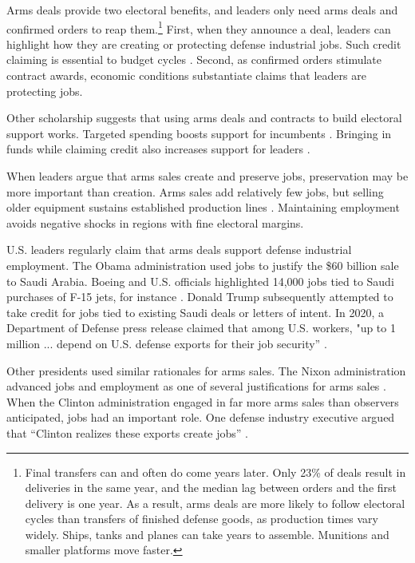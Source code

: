 \documentclass[12pt]{article}
\begin{document}
Arms deals provide two electoral benefits, and leaders only need arms deals and confirmed orders to reap them.\footnote{Final transfers can and often do come years later. 
Only 23\% of deals result in deliveries in the same year, and the median lag between orders and the first delivery is one year. 
As a result, arms deals are more likely to follow electoral cycles than transfers of finished defense goods, as production times vary widely. 
Ships, tanks and planes can take years to assemble.
Munitions and smaller platforms move faster.}
First, when they announce a deal, leaders can highlight how they are creating or protecting defense industrial jobs. 
Such credit claiming is essential to budget cycles \citep{Bueno2021}. 
Second, as confirmed orders stimulate contract awards, economic conditions substantiate claims that leaders are protecting jobs. 


Other scholarship suggests that using arms deals and contracts to build electoral support works. 
Targeted spending boosts support for incumbents \citep{KrinerReeves2012}.
Bringing in funds while claiming credit also increases support for leaders \citep{Grimmeretal2012}. 


When leaders argue that arms sales create and preserve jobs, preservation may be more important than creation. 
Arms sales add relatively few jobs, but selling older equipment sustains established production lines \citep{Caverley2018}. 
Maintaining employment avoids negative shocks in regions with fine electoral margins. 


U.S. leaders regularly claim that arms deals support defense industrial employment. 
The Obama administration used jobs to justify the \$60 billion sale to Saudi Arabia.
Boeing and U.S. officials highlighted 14,000 jobs tied to Saudi purchases of F-15 jets, for instance \citep{hillsaudisale2010}.
Donald Trump subsequently attempted to take credit for jobs tied to existing Saudi deals or letters of intent. 
In 2020, a Department of Defense press release claimed that among U.S. workers, "up to 1 million ... depend on U.S. defense exports for their job security'' \citep{dodarmsjobs2020}. 


Other presidents used similar rationales for arms sales.
The Nixon administration advanced jobs and employment as one of several justifications for arms sales \citep[pg. 34]{Sorley1983}. 
When the Clinton administration engaged in far more arms sales than observers anticipated, jobs had an important role.
One defense industry executive argued that ``Clinton realizes these exports create jobs'' \citep{clintonarms1993}.
\end{document}
